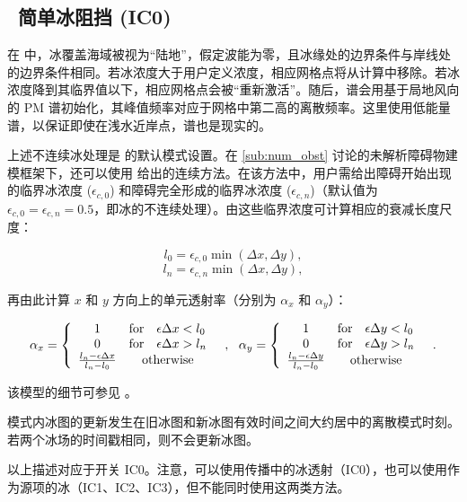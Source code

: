 \vssub
\subsection{~简单冰阻挡 ({\code IC0})} \label{sub:num_ice}

\noindent
在 \ws{} 中，冰覆盖海域被视为“陆地”，假定波能为零，且冰缘处的边界条件与岸线处的边界条件相同。若冰浓度大于用户定义浓度，相应网格点将从计算中移除。若冰浓度降到其临界值以下，相应网格点会被“重新激活”。随后，谱会用基于局地风向的 PM 谱初始化，其峰值频率对应于网格中第二高的离散频率。这里使用低能量谱，以保证即使在浅水近岸点，谱也是现实的。

上述不连续冰处理是 \ws{} 的默认模式设置。在 \para\ref{sub:num_obst} 讨论的未解析障碍物建模框架下，还可以使用 \cite{tol:OMOD03a} 给出的连续方法。在该方法中，用户需给出障碍开始出现的临界冰浓度
($\epsilon_{c,0}$) 和障碍完全形成的临界冰浓度 ($\epsilon_{c,n}$)（默认值为 $\epsilon_{c,0} = \epsilon_{c,n} =
0.5$，即冰的不连续处理）。由这些临界浓度可计算相应的衰减长度尺度：

\begin{equation}
l_0 = \epsilon_{c,0} \min ( \Delta x , \Delta y )
, \label{eq:l0}
\end{equation}
\begin{equation}
l_n = \epsilon_{c,n} \min ( \Delta x , \Delta y )
, \label{eq:ln}
\end{equation}

\noindent
再由此计算 $x$ 和 $y$ 方向上的单元透射率（分别为 $\alpha_x$ 和 $\alpha_y$）：

\begin{equation}
\alpha_x = \left \{ \begin{array}{ccl}
 1 & \mbox{for} & \epsilon \Delta x < l_0 \\
 0 & \mbox{for} & \epsilon \Delta x > l_n \\
\frac{l_n - \epsilon \Delta x}{l_n - l_0} & \multicolumn{2}{c}{\mbox{otherwise}} 
\end{array} \right .
\:\:\: , \:\:\:
\alpha_y = \left \{ \begin{array}{ccl}
 1 & \mbox{for} & \epsilon \Delta y < l_0 \\
 0 & \mbox{for} & \epsilon \Delta y > l_n \\
\frac{l_n - \epsilon \Delta y}{l_n - l_0} & \multicolumn{2}{c}{\mbox{otherwise}} 
\end{array} \right .
\:\:\: . \label{eq:ice_0} 
\end{equation}

\noindent
该模型的细节可参见 \cite{tol:OMOD03a}。

模式内冰图的更新发生在旧冰图和新冰图有效时间之间大约居中的离散模式时刻。若两个冰场的时间戳相同，则不会更新冰图。

以上描述对应于开关 {\code IC0}。注意，可以使用传播中的冰透射（{\code IC0}），也可以使用作为源项的冰（{\code IC1}、{\code IC2}、{\code IC3}），但不能同时使用这两类方法。
